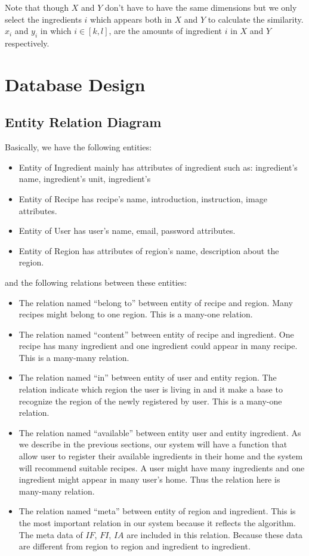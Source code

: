 Note that though $X$ and $Y$ don't have to have the same dimensions but we only select the ingredients $i$ which appears both in $X$ and $Y$ to calculate the similarity. $x_i$ and $y_i$ in which $i \in [k,l]$, are the amounts of ingredient $i$ in $X$ and $Y$ respectively.

\section{Database Design}


\subsection{Entity Relation Diagram}

Basically, we have the following entities:
\begin{itemize}
\item Entity of Ingredient mainly has attributes of ingredient such as: ingredient's name, ingredient's unit, ingredient's 
\item Entity of Recipe has recipe's name, introduction, instruction, image attributes.
\item Entity of User has user's name, email, password attributes.
\item Entity of Region has attributes of region's name, description about the region.
\end{itemize}

and the following relations between these entities:

\begin{itemize}
\item The relation named ``belong to'' between entity of recipe and region. Many recipes might belong to one region. This is a many-one relation. 
\item The relation named ``content'' between entity of recipe and ingredient. One recipe has many ingredient and one ingredient could appear in many recipe. This is a many-many relation. 
\item The relation named ``in'' between entity of user and entity region. The relation indicate which region the user is living in and it make a base to recognize the region of the newly registered by user. This is a many-one relation.
\item The relation named ``available'' between entity user and entity ingredient. As we describe in the previous sections, our system will have a function that allow user to register their available ingredients in their home and the system will recommend suitable recipes. A user might have many ingredients and one ingredient might appear in many user's home. Thus the relation here is many-many relation.
\item The relation named ``meta'' between entity of region and ingredient. This is the most important relation in our system because it reflects the algorithm. The meta data of $IF$, $FI$, $IA$ are included in this relation. Because these data are different from region to region and ingredient to ingredient. 
\end{itemize}


